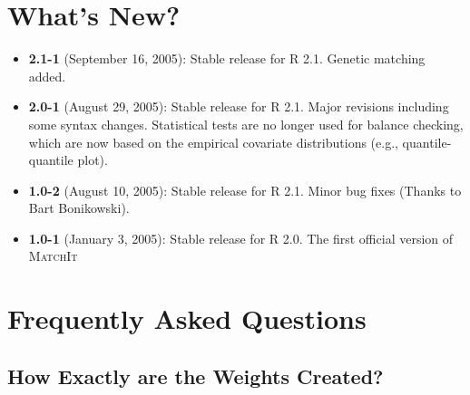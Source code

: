 \documentclass[oneside,letterpaper,titlepage]{article}
\newcommand{\MatchIt}{\textsc{MatchIt}}
\begin{document}

\section{What's New?}

\begin{itemize}
\item \textbf{2.1-1} (September 16, 2005): Stable release for R
  	2.1. Genetic matching added.	
\item \textbf{2.0-1} (August 29, 2005): Stable release for R 2.1.
  Major revisions including some syntax changes. Statistical tests are
  no longer used for balance checking, which are now based on the
  empirical covariate distributions (e.g., quantile-quantile plot).
\item \textbf{1.0-2} (August 10, 2005): Stable release for R
  2.1. Minor bug fixes (Thanks to Bart Bonikowski).
\item \textbf{1.0-1} (January 3, 2005): Stable release for R 2.0. The
  first official version of \MatchIt
\end{itemize}




\section{Frequently Asked Questions}

%

\subsection{How Exactly are the Weights Created?}
\label{subsec:weights}
\end{document}
